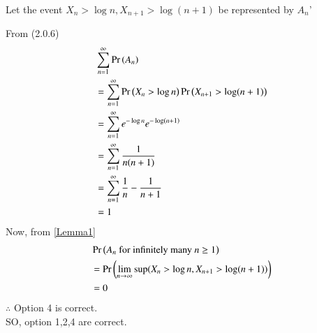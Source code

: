 \documentclass[journal,12pt,twocolumn]{IEEEtran}
\begin{document}
\begin{enumerate}
    Let the event $X_n > \log n,X_{n+1}>\log (n+1)$ be represented by $A_n$'
    
    From (2.0.6)
    \begin{align}
        &\sum_{n=1}^{\infty}\Pr\left(A_n\right)\\
        &= \sum_{n=1}^{\infty}\Pr\left(X_n>\log n\right)\Pr\left(X_{n+1}>\log (n+1)\right)\\
        &=\sum_{n=1}^{\infty}e^{-\log n}e^{-\log (n+1)}\\
        &=\sum_{n=1}^{\infty}\frac{1}{n(n+1)}\\
        &=\sum_{n=1}^{\infty}\frac{1}{n}-\frac{1}{n+1}\\
        &=1
    \end{align}
    Now, from \eqref{Lemma1}
    \begin{align}
        &\Pr\left(A_n\text{ for infinitely many }n\geq1\right)\\
        &=\Pr\left(\lim_{n \rightarrow \infty}\sup ( X_n>\log n,X_{n+1}>\log (n+1))\right)\\
        &=0
    \end{align}
    $\therefore$ Option 4 is correct.\\
    SO, option 1,2,4 are correct.
\end{enumerate}
\end{document}
